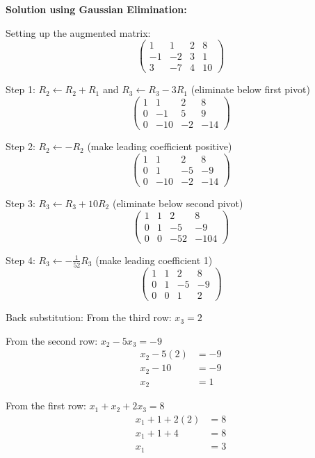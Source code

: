 \documentclass[12pt]{article}
\begin{document}
\textbf{Solution using Gaussian Elimination:}

Setting up the augmented matrix:
\[
\left(\begin{array}{ccc|c}
1 & 1 & 2 & 8\\
-1 & -2 & 3 & 1\\
3 & -7 & 4 & 10
\end{array}\right)
\]

Step 1: $R_2 \leftarrow R_2 + R_1$ and $R_3 \leftarrow R_3 - 3R_1$ (eliminate below first pivot)
\[
\left(\begin{array}{ccc|c}
1 & 1 & 2 & 8\\
0 & -1 & 5 & 9\\
0 & -10 & -2 & -14
\end{array}\right)
\]

Step 2: $R_2 \leftarrow -R_2$ (make leading coefficient positive)
\[
\left(\begin{array}{ccc|c}
1 & 1 & 2 & 8\\
0 & 1 & -5 & -9\\
0 & -10 & -2 & -14
\end{array}\right)
\]

Step 3: $R_3 \leftarrow R_3 + 10R_2$ (eliminate below second pivot)
\[
\left(\begin{array}{ccc|c}
1 & 1 & 2 & 8\\
0 & 1 & -5 & -9\\
0 & 0 & -52 & -104
\end{array}\right)
\]

Step 4: $R_3 \leftarrow -\frac{1}{52}R_3$ (make leading coefficient 1)
\[
\left(\begin{array}{ccc|c}
1 & 1 & 2 & 8\\
0 & 1 & -5 & -9\\
0 & 0 & 1 & 2
\end{array}\right)
\]

Back substitution:
From the third row: $x_3 = 2$

From the second row: $x_2 - 5x_3 = -9$
\begin{align*}
x_2 - 5(2) &= -9\\
x_2 - 10 &= -9\\
x_2 &= 1
\end{align*}

From the first row: $x_1 + x_2 + 2x_3 = 8$
\begin{align*}
x_1 + 1 + 2(2) &= 8\\
x_1 + 1 + 4 &= 8\\
x_1 &= 3
\end{align*}
\end{document}
